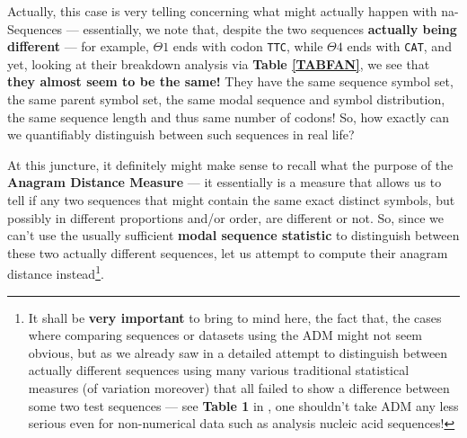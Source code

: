 \documentclass[a4paper, 18pt]{book} %
\begin{document}
Actually, this case is very telling concerning what might actually happen with na-Sequences --- essentially, we note that, despite the two sequences \textbf{actually being different} --- for example, $\Theta1$ ends with codon \texttt{TTC}, while $\Theta4$ ends with \texttt{CAT}, and yet, looking at their breakdown analysis via \textbf{Table \ref{TABFAN}}, we see that \textbf{they almost seem to be the same!} They have the same sequence symbol set, the same parent symbol set, the same modal sequence and symbol distribution, the same sequence length and thus same number of codons! So, how exactly can we quantifiably distinguish between such sequences in real life?

At this juncture, it definitely might make sense to recall what the purpose of the \textbf{Anagram Distance Measure}\cite{adtpaper} --- it essentially is a measure that allows us to tell if any two sequences that might contain the same exact distinct symbols, but possibly in different proportions and/or order, are different or not. So, since we can't use the usually sufficient \textbf{modal sequence statistic}\cite{transformatics} to distinguish between these two actually different sequences, let us attempt to compute their anagram distance instead\footnote{It shall be \textbf{very important} to bring to mind here, the fact that, the cases where comparing sequences or datasets using the ADM might not seem obvious, but as we already saw in a detailed attempt to distinguish between actually different sequences using many various traditional statistical measures  (of variation moreover) that all failed to show a difference between some two test sequences --- see \textbf{Table 1} in \cite{transformatics}, one shouldn't take ADM any less serious even for non-numerical data such as analysis nucleic acid sequences!}. 
\end{document}
